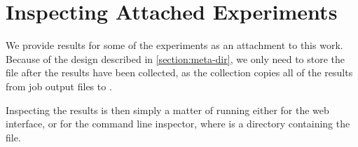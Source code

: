 \section{Inspecting Attached Experiments}

We provide results for some of the experiments as an attachment to this work. Because of the design described in \autoref{section:meta-dir}, we only need to store the  file after the results have been collected, as the collection copies all of the results from job output files to .

Inspecting the results is then simply a matter of running either  for the web interface, or  for the command line inspector, where  is a directory containing the  file.


